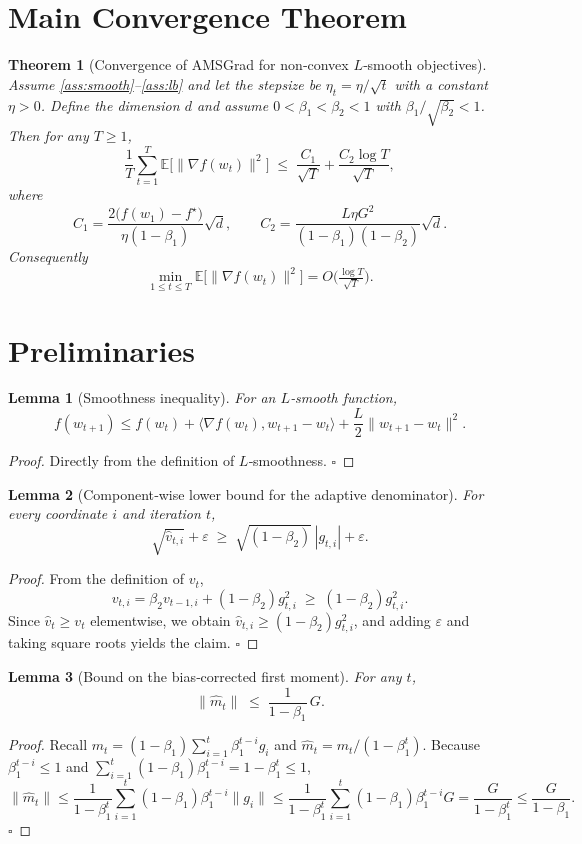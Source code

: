 \documentclass{article}
\newtheorem{theorem}{Theorem}
\newtheorem{lemma}{Lemma}
\begin{document}
\section*{Main Convergence Theorem}
\begin{theorem}[Convergence of AMSGrad for non‑convex $L$‑smooth objectives]\label{thm:main}
Assume \ref{ass:smooth}–\ref{ass:lb} and let the stepsize be $\eta_t=\eta/\sqrt{t}$ with a constant $\eta>0$.
Define the dimension $d$ and assume $0<\beta_1<\beta_2<1$ with
$\beta_1/\sqrt{\beta_2}<1$.
Then for any $T\ge 1$,
\[
\frac{1}{T}\sum_{t=1}^{T}\mathbb{E}\!\big[\|\nabla f(w_t)\|^2\big]
\;\le\;
\frac{C_1}{\sqrt{T}}+\frac{C_2\log T}{\sqrt{T}},
\]
where
\[
C_1=\frac{2\big(f(w_1)-f^\star\big)}{\eta(1-\beta_1)}\sqrt{d},
\qquad
C_2=\frac{L\eta G^2}{(1-\beta_1)(1-\beta_2)}\sqrt{d}.
\]
Consequently
\[
\min_{1\le t\le T}\mathbb{E}\!\big[\|\nabla f(w_t)\|^2\big]
=O\!\big(\tfrac{\log T}{\sqrt{T}}\big).
\]
\end{theorem}

\section*{Preliminaries}
\begin{lemma}[Smoothness inequality]\label{lem:smooth}
For an $L$‑smooth function,
\[
f(w_{t+1})\le f(w_t)+\langle\nabla f(w_t),w_{t+1}-w_t\rangle
+\frac{L}{2}\|w_{t+1}-w_t\|^2 .
\]
\end{lemma}
\begin{proof}
Directly from the definition of $L$‑smoothness. \hfill $\square$
\end{proof}

\begin{lemma}[Component‑wise lower bound for the adaptive denominator]\label{lem:denom2}
For every coordinate $i$ and iteration $t$,
\[
\sqrt{\hat v_{t,i}}+\varepsilon \;\ge\;
\sqrt{(1-\beta_2)}\,|g_{t,i}|+\varepsilon .
\]
\end{lemma}
\begin{proof}
From the definition of $v_t$,
\[
v_{t,i}= \beta_2 v_{t-1,i}+(1-\beta_2)g_{t,i}^2
\;\ge\;(1-\beta_2)g_{t,i}^2 .
\]
Since $\hat v_t\ge v_t$ elementwise, we obtain
$\hat v_{t,i}\ge (1-\beta_2)g_{t,i}^2$, and adding $\varepsilon$ and taking
square roots yields the claim. \hfill $\square$
\end{proof}

\begin{lemma}[Bound on the bias‑corrected first moment]\label{lem:mhatbound}
For any $t$,
\[
\|\hat m_t\| \;\le\; \frac{1}{1-\beta_1}\,G .
\]
\end{lemma}
\begin{proof}
Recall $m_t=(1-\beta_1)\sum_{i=1}^{t}\beta_1^{t-i}g_i$ and
$\hat m_t=m_t/(1-\beta_1^{t})$.
Because $\beta_1^{t-i}\le 1$ and $\sum_{i=1}^{t}(1-\beta_1)\beta_1^{t-i}=1-\beta_1^{t}\le 1$,
\[
\|\hat m_t\|
\le \frac{1}{1-\beta_1^{t}}\sum_{i=1}^{t}(1-\beta_1)\beta_1^{t-i}\|g_i\|
\le \frac{1}{1-\beta_1^{t}}\sum_{i=1}^{t}(1-\beta_1)\beta_1^{t-i}G
= \frac{G}{1-\beta_1^{t}}
\le \frac{G}{1-\beta_1}.
\]
\hfill $\square$
\end{proof}
\end{document}
